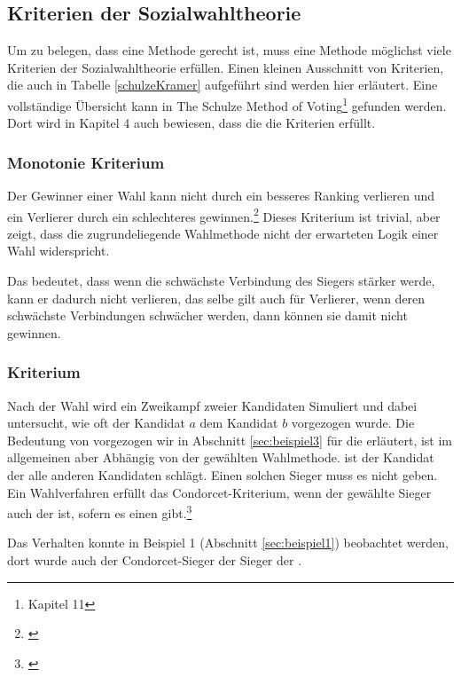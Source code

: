 \subsection{Kriterien der Sozialwahltheorie}
\label{sec:kriterienSozial}
Um zu belegen, dass eine Methode gerecht ist, muss eine Methode möglichst viele Kriterien der Sozialwahltheorie erfüllen. Einen kleinen Ausschnitt von Kriterien, die auch in Tabelle \ref{schulzeKramer} aufgeführt sind werden hier erläutert. Eine vollständige Übersicht kann in \glqq The Schulze Method
of Voting\grqq{}\footnote{\Vgl \citet{Schulze2018} Kapitel 11} gefunden werden. Dort wird in Kapitel 4 auch bewiesen, dass die \schulze die Kriterien erfüllt.


\subsubsection{Monotonie Kriterium} 
\label{sec:monotoniekriterium}
Der Gewinner einer Wahl kann nicht durch ein besseres Ranking verlieren und ein Verlierer durch ein schlechteres gewinnen.\footnote{\Vgl \citet{Woodall1996}} Dieses Kriterium ist trivial, aber zeigt, dass die zugrundeliegende Wahlmethode nicht der erwarteten Logik einer Wahl widerspricht.

Das bedeutet, dass wenn die schwächste Verbindung des Siegers stärker werde, kann er dadurch nicht verlieren, das selbe gilt auch für Verlierer, wenn deren schwächste Verbindungen schwächer werden, dann können sie damit nicht gewinnen.

\subsubsection{\condorcet Kriterium} 
\label{sec:condorectKriterium}
Nach der Wahl wird ein Zweikampf zweier Kandidaten Simuliert und dabei untersucht, wie oft der Kandidat $a$ dem Kandidat $b$ vorgezogen wurde. Die Bedeutung von \glqq vorgezogen\grqq{} wir in Abschnitt \ref{sec:beispiel3} für die \schulze erläutert, ist im allgemeinen aber Abhängig von der gewählten Wahlmethode. \condorcetSieger ist der Kandidat der alle anderen Kandidaten schlägt. Einen solchen Sieger muss es nicht geben. Ein Wahlverfahren erfüllt das Condorcet-Kriterium, wenn der gewählte Sieger auch der \condorcetSieger ist, sofern es einen \condorcetSieger gibt.\footnote{\Vgl \citet{Johnson2005}}

Das Verhalten konnte in Beispiel 1 (Abschnitt \ref{sec:beispiel1}) beobachtet werden, dort wurde auch der Condorcet-Sieger der Sieger der \schulze .

